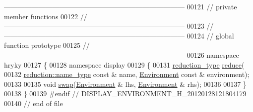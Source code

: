 \begin{DoxyCode}
{      ------------------------------------------------------------------------------}
00121 \textcolor{comment}{// private member functions}
00122 \textcolor{comment}{//
      ------------------------------------------------------------------------------}
00123 \textcolor{comment}{//
      ------------------------------------------------------------------------------}
00124 \textcolor{comment}{// global function prototype}
00125 \textcolor{comment}{//
      ------------------------------------------------------------------------------}
00126 \textcolor{keyword}{namespace }hryky
00127 \{
00128 \textcolor{keyword}{namespace }display
00129 \{
00131     \hyperlink{classhryky_1_1_intrusive_ptr}{reduction_type} \hyperlink{namespacehryky_1_1display_a705ac3a5de0998e1e0d3fa595044ec55}{reduce}(
00132         \hyperlink{classhryky_1_1reduction_1_1_string}{reduction::name_type} \textcolor{keyword}{const} & name, \hyperlink{classhryky_1_1display_1_1_environment}{Environment} \textcolor{keyword}{const} & environment);
00133     
00135     \textcolor{keywordtype}{void} \hyperlink{namespacehryky_1_1display_ad28f0d5e406742090973e6c81321a00f}{swap}(\hyperlink{classhryky_1_1display_1_1_environment}{Environment} & lhs, \hyperlink{classhryky_1_1display_1_1_environment}{Environment} & rhs);
00136 
00137 \}
00138 \}
00139 \textcolor{preprocessor}{#endif // DISPLAY\_ENVIRONMENT\_H\_20120128121804179}
00140 \textcolor{preprocessor}{}\textcolor{comment}{// end of file}
\end{DoxyCode}
